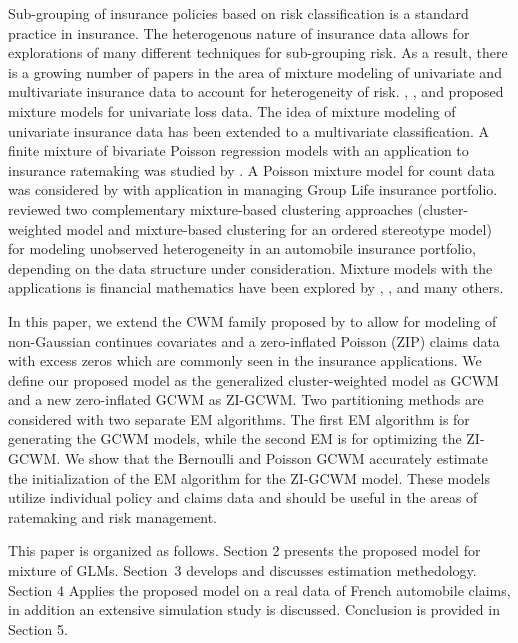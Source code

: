 \documentclass[11pt,letterpaper]{article}
\numberwithin{equation}{section}
\numberwithin{equation}{section}
\numberwithin{equation}{section}
\begin{document}
Sub-grouping of insurance policies based on risk classification is a standard practice in insurance. The heterogenous nature of insurance data allows for explorations of many different techniques for sub-grouping risk. As a result, there is a growing number of papers in the area of mixture modeling of univariate and multivariate insurance data to account for heterogeneity of risk. \cite{Lee+Lin:2010}, \cite{Verbelen+Gong+Antonio+Badescu+Lin:2015}, and \cite{Miljkovic+Grun:2016} proposed mixture models for univariate loss data. The idea of mixture modeling of univariate insurance data has been extended to a multivariate classification. A finite mixture of bivariate Poisson regression models with an application to insurance ratemaking was studied by \cite{Bermudez+Karlis:2012}. A Poisson mixture model for count data was considered by \cite{Brown+Buckley:2015} with application in managing Group Life insurance portfolio. \cite{risks_miljkovic} reviewed two complementary mixture-based clustering approaches (cluster-weighted model and mixture-based clustering for an ordered stereotype model) for modeling unobserved heterogeneity in an automobile insurance portfolio, depending on the data structure under consideration. Mixture models with the applications is financial mathematics have been explored by \cite{durham2007sv}, \cite{miljkovic2018new}, and many others.

In this paper, we extend the CWM family proposed by \cite{Ingrassia+Punzo+Vittadini+Minotti:2015} to allow for modeling of non-Gaussian continues covariates and a zero-inflated Poisson (ZIP) claims data with excess zeros which are commonly seen in the insurance applications. We define our proposed model as the generalized cluster-weighted model as GCWM and a new zero-inflated GCWM as ZI-GCWM. Two partitioning methods are considered with two separate EM algorithms. The first EM algorithm is for generating the GCWM models, while the second EM is for optimizing the ZI-GCWM. We show that the Bernoulli and Poisson GCWM accurately estimate the initialization of the EM algorithm for the ZI-GCWM model. These models utilize individual policy and claims data and should be useful in the areas of ratemaking and risk management.

This paper is organized as follows. Section 2 presents the proposed model for mixture of GLMs. Section~3 develops and discusses estimation methedology. Section 4 Applies the proposed model on a real data of French automobile claims, in addition an extensive simulation study is discussed. Conclusion is provided in Section 5.
\end{document}
